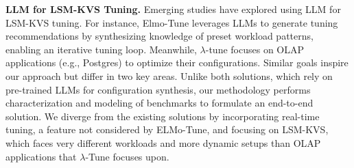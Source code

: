 \vspace{0.3em}
\noindent\textbf{LLM for LSM-KVS Tuning.}
Emerging studies \cite{Thakkar2024can, giannankouris2024lambda, giannakouris2024demonstrating} have explored using LLM for LSM-KVS tuning. For instance, Elmo-Tune \cite{Thakkar2024can} leverages LLMs to generate tuning recommendations by synthesizing knowledge of preset workload patterns, enabling an iterative tuning loop. Meanwhile, $\lambda$-tune \cite{giannankouris2024lambda, giannakouris2024demonstrating} focuses on OLAP applications (e.g., Postgres) to optimize their configurations. Similar goals inspire our approach but differ in two key areas. Unlike both solutions, which rely on pre-trained LLMs for configuration synthesis, our methodology performs characterization and modeling of benchmarks to formulate an end-to-end solution. We diverge from the existing solutions by incorporating real-time tuning, a feature not considered by ELMo-Tune, and focusing on LSM-KVS, which faces very different workloads and more dynamic setups than OLAP applications that $\lambda$-Tune focuses upon.